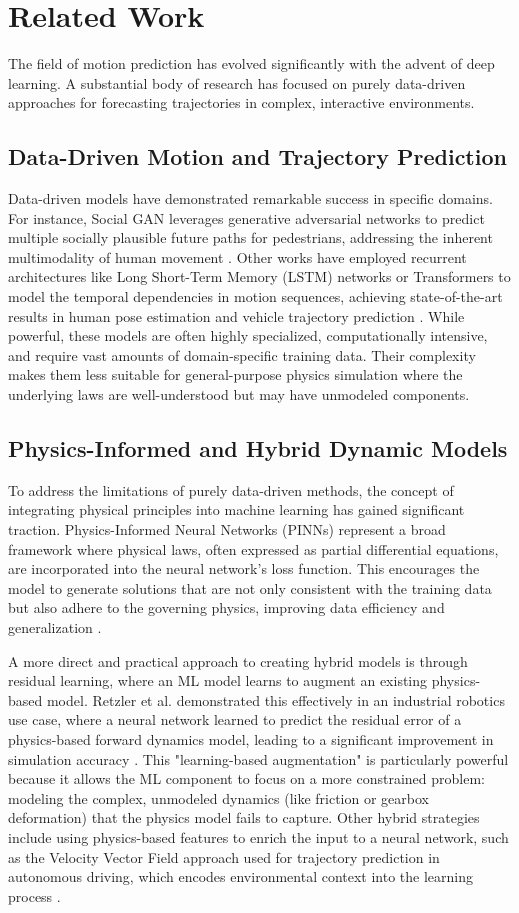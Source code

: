 \documentclass[conference]{IEEEtran}
\begin{document}
\section{Related Work}
The field of motion prediction has evolved significantly with the advent of deep learning. A substantial body of research has focused on purely data-driven approaches for forecasting trajectories in complex, interactive environments.

\subsection{Data-Driven Motion and Trajectory Prediction}
Data-driven models have demonstrated remarkable success in specific domains. For instance, Social GAN leverages generative adversarial networks to predict multiple socially plausible future paths for pedestrians, addressing the inherent multimodality of human movement \cite{b9}. Other works have employed recurrent architectures like Long Short-Term Memory (LSTM) networks or Transformers to model the temporal dependencies in motion sequences, achieving state-of-the-art results in human pose estimation and vehicle trajectory prediction \cite{b6, b10}. While powerful, these models are often highly specialized, computationally intensive, and require vast amounts of domain-specific training data. Their complexity makes them less suitable for general-purpose physics simulation where the underlying laws are well-understood but may have unmodeled components.

\subsection{Physics-Informed and Hybrid Dynamic Models}
To address the limitations of purely data-driven methods, the concept of integrating physical principles into machine learning has gained significant traction. Physics-Informed Neural Networks (PINNs) represent a broad framework where physical laws, often expressed as partial differential equations, are incorporated into the neural network's loss function. This encourages the model to generate solutions that are not only consistent with the training data but also adhere to the governing physics, improving data efficiency and generalization \cite{b7, b11}.

A more direct and practical approach to creating hybrid models is through residual learning, where an ML model learns to augment an existing physics-based model. Retzler et al. demonstrated this effectively in an industrial robotics use case, where a neural network learned to predict the residual error of a physics-based forward dynamics model, leading to a significant improvement in simulation accuracy \cite{b8}. This "learning-based augmentation" is particularly powerful because it allows the ML component to focus on a more constrained problem: modeling the complex, unmodeled dynamics (like friction or gearbox deformation) that the physics model fails to capture. Other hybrid strategies include using physics-based features to enrich the input to a neural network, such as the Velocity Vector Field approach used for trajectory prediction in autonomous driving, which encodes environmental context into the learning process \cite{b12}.
\end{document}
